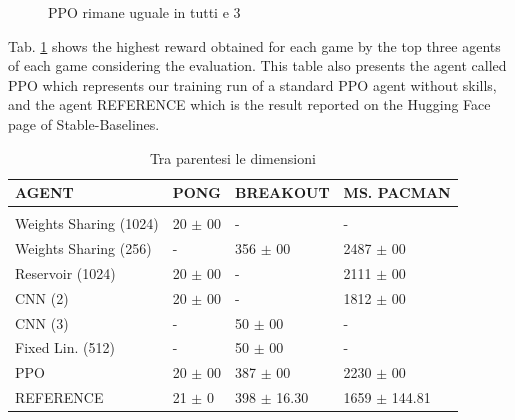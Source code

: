 \begin{figure}[htbp]
    \caption{PPO
 rimane uguale in tutti e 3}
    \label{fig:trainresults}
\end{figure}



Tab. \ref{tab:results} shows the highest reward obtained for each game by the top three agents of each game considering the evaluation. This table also presents the agent called PPO which represents our training run of a standard PPO agent without skills, and the agent REFERENCE which is the result reported on the Hugging Face page of Stable-Baselines.

\begin{table}[htbp]
    \begin{center}
        \begin{tabular}{llll}
            \multicolumn{1}{l}{AGENT}  &\multicolumn{1}{l}{\bf PONG} &\multicolumn{1}{l}{\bf BREAKOUT} &\multicolumn{1}{l}{\bf MS. PACMAN}
            \\ \hline \\
            Weights Sharing (1024) &  20 $\pm$ 00 &  - &  -  \\
            Weights Sharing (256)  &  - &  356 $\pm$ 00 &  2487 $\pm$ 00  \\
            Reservoir (1024)       &  20 $\pm$ 00 &  - &  2111 $\pm$ 00 \\
            CNN (2)                &  20 $\pm$ 00 &  - &  1812 $\pm$ 00 \\
            CNN (3)                &  - &  50 $\pm$ 00 &  - \\
            Fixed Lin. (512)                &  - &  50 $\pm$ 00 &  - \\
            PPO                    &  20 $\pm$ 00 &  387 $\pm$ 00 &  2230 $\pm$ 00 \\
            REFERENCE              &  21 $\pm$ 0 &  398 $\pm$ 16.30 &  1659 $\pm$ 144.81 \\
        \end{tabular}
    \end{center}
    \caption{Tra parentesi le dimensioni}
    \label{tab:results}
\end{table}


